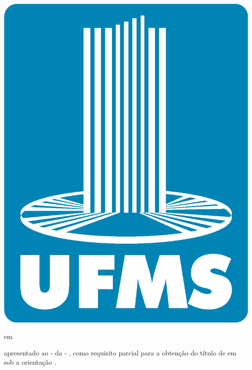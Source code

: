 \begin{center}
	\centerline{\includegraphics[scale=.18]{figuras/logo-ufms.eps}}
	
	\vskip 0.5cm
	
	{\fontsize{14pt}{14pt}\selectfont {\instituicaoTRAB}} \break
	{\fontsize{12pt}{12pt}\selectfont \campusInstituicaoTRAB} \break
	{\fontsize{12pt}{12pt}\selectfont {\grauCursoTRAB } em { \cursoTRAB}}
	
	\vskip 2.5cm
	
	{\fontsize{16pt}{16pt}\selectfont \tituloTRAB}
	
	\vskip 2.5cm
	
	{\fontsize{12pt}{12pt}\selectfont \academicoUmTRAB \break \academicoDoisTRAB \break \academicoTresTRAB}
	
	\vskip 1.5cm

	\hspace{8.5cm}
	\begin{minipage}{7.5cm}
		\fontsize{11pt}{11pt}\selectfont
		{\denominacaoExtensaTrabalhoTRAB } apresentado ao { \campusInstituicaoTRAB } - {\siglaCampusInstituicaoTRAB } da { \instituicaoTRAB } - { \siglaInstituicaoTRAB}, como requisito parcial para a obtenção do título de { \grauFormacaoTRAB } em { \cursoTRAB } sob a orientação { \preposicaoOrientadorTRAB } { \titulcaoOrientadorTRAB } {\nomeOrientadorTRAB}.
	\end{minipage}%
	\vspace*{\fill}
	

\end{center}

